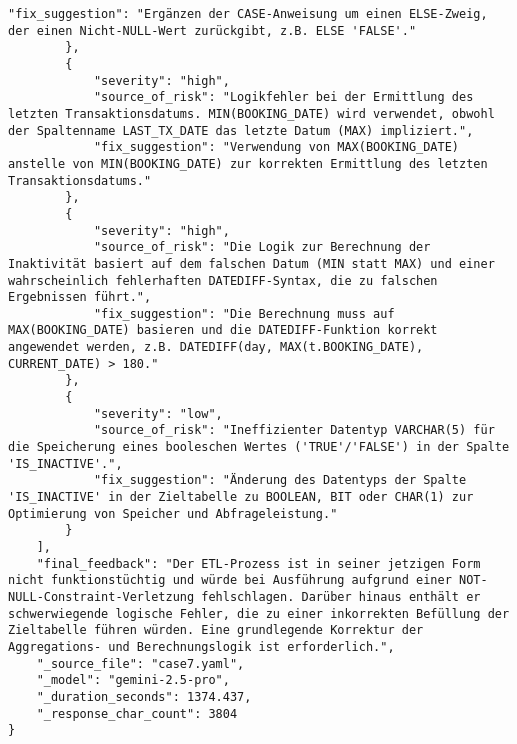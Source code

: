 \begin{lstlisting}[caption={Ausgabe: Gemini 2.5 Pro Anwendungsfall 7 Hauptdurchlauf},label={gemini_case7_prompt1}]
            "fix_suggestion": "Ergänzen der CASE-Anweisung um einen ELSE-Zweig, der einen Nicht-NULL-Wert zurückgibt, z.B. ELSE 'FALSE'."
        },
        {
            "severity": "high",
            "source_of_risk": "Logikfehler bei der Ermittlung des letzten Transaktionsdatums. MIN(BOOKING_DATE) wird verwendet, obwohl der Spaltenname LAST_TX_DATE das letzte Datum (MAX) impliziert.",
            "fix_suggestion": "Verwendung von MAX(BOOKING_DATE) anstelle von MIN(BOOKING_DATE) zur korrekten Ermittlung des letzten Transaktionsdatums."
        },
        {
            "severity": "high",
            "source_of_risk": "Die Logik zur Berechnung der Inaktivität basiert auf dem falschen Datum (MIN statt MAX) und einer wahrscheinlich fehlerhaften DATEDIFF-Syntax, die zu falschen Ergebnissen führt.",
            "fix_suggestion": "Die Berechnung muss auf MAX(BOOKING_DATE) basieren und die DATEDIFF-Funktion korrekt angewendet werden, z.B. DATEDIFF(day, MAX(t.BOOKING_DATE), CURRENT_DATE) > 180."
        },
        {
            "severity": "low",
            "source_of_risk": "Ineffizienter Datentyp VARCHAR(5) für die Speicherung eines booleschen Wertes ('TRUE'/'FALSE') in der Spalte 'IS_INACTIVE'.",
            "fix_suggestion": "Änderung des Datentyps der Spalte 'IS_INACTIVE' in der Zieltabelle zu BOOLEAN, BIT oder CHAR(1) zur Optimierung von Speicher und Abfrageleistung."
        }
    ],
    "final_feedback": "Der ETL-Prozess ist in seiner jetzigen Form nicht funktionstüchtig und würde bei Ausführung aufgrund einer NOT-NULL-Constraint-Verletzung fehlschlagen. Darüber hinaus enthält er schwerwiegende logische Fehler, die zu einer inkorrekten Befüllung der Zieltabelle führen würden. Eine grundlegende Korrektur der Aggregations- und Berechnungslogik ist erforderlich.",
    "_source_file": "case7.yaml",
    "_model": "gemini-2.5-pro",
    "_duration_seconds": 1374.437,
    "_response_char_count": 3804
}
\end{lstlisting}

